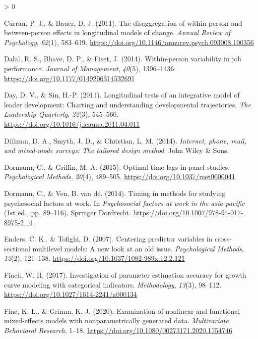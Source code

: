 \documentclass[
12pt, %
twoside,
english]{guelphthesis}
\newlength{\cslhangindent}
\newenvironment{CSLReferences}[2] %
 {%
  \setlength{\parindent}{0pt}
  \ifodd #1 \everypar{\setlength{\hangindent}{\cslhangindent}}\ignorespaces\fi
  \ifnum #2 > 0
  \setlength{\parskip}{\linespacing{2}}
  \fi
 }%
 {}
\begin{document}
\begin{CSLReferences}{1}{0}
\leavevmode{}%
Curran, P. J., \& Bauer, D. J. (2011). The disaggregation of within-person and between-person effects in longitudinal models of change. \emph{Annual Review of Psychology}, \emph{62}(1), 583--619. \url{https://doi.org/10.1146/annurev.psych.093008.100356}

\leavevmode{}%
Dalal, R. S., Bhave, D. P., \& Fiset, J. (2014). Within-person variability in job performance. \emph{Journal of Management}, \emph{40}(5), 1396--1436. \url{https://doi.org/10.1177/0149206314532691}

\leavevmode{}%
Day, D. V., \& Sin, H.-P. (2011). Longitudinal tests of an integrative model of leader development: Charting and understanding developmental trajectories. \emph{The Leadership Quarterly}, \emph{22}(3), 545--560. \url{https://doi.org/10.1016/j.leaqua.2011.04.011}

\leavevmode{}%
Dillman, D. A., Smyth, J. D., \& Christian, L. M. (2014). \emph{Internet, phone, mail, and mixed-mode surveys: The tailored design method}. John Wiley \& Sons.

\leavevmode{}%
Dormann, C., \& Griffin, M. A. (2015). Optimal time lags in panel studies. \emph{Psychological Methods}, \emph{20}(4), 489--505. \url{https://doi.org/10.1037/met0000041}

\leavevmode{}%
Dormann, C., \& Ven, B. van de. (2014). Timing in methods for studying psychosocial factors at work. In \emph{Psychosocial factors at work in the asia pacific} (1st ed., pp. 89--116). Springer Dordrecht. \url{https://doi.org/10.1007/978-94-017-8975-2_4}

\leavevmode{}%
Enders, C. K., \& Tofighi, D. (2007). Centering predictor variables in cross-sectional multilevel models: A new look at an old issue. \emph{Psychological Methods}, \emph{12}(2), 121--138. \url{https://doi.org/10.1037/1082-989x.12.2.121}

\leavevmode{}%
Finch, W. H. (2017). Investigation of parameter estimation accuracy for growth curve modeling with categorical indicators. \emph{Methodology}, \emph{13}(3), 98--112. \url{https://doi.org/10.1027/1614-2241/a000134}

\leavevmode{}%
Fine, K. L., \& Grimm, K. J. (2020). Examination of nonlinear and functional mixed-effects models with nonparametrically generated data. \emph{Multivariate Behavioral Research}, 1--18. \url{https://doi.org/10.1080/00273171.2020.1754746}


\end{CSLReferences}
\end{document}
